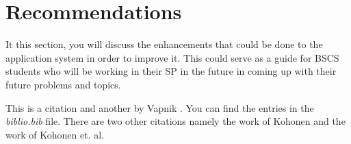 \section{Recommendations}

It this section, you will discuss the enhancements that could be done to the application system in order to improve it. This could serve as
a guide for BSCS students who will be working in their SP in the future in coming up with their future problems and topics.

This is a citation \cite{Pavlovic} and another by Vapnik \cite{Vapnik}. You can find the entries in the {\it biblio.bib} file. There are two other citations namely the work of Kohonen \cite{Kohonen2} and the work of Kohonen et. al. \cite{Kohonen1}
